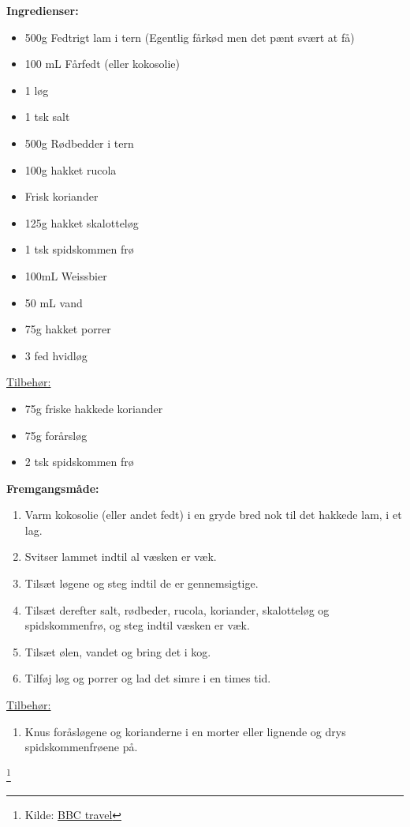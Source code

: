 \documentclass{book}
\begin{document}
{\begin{minipage}[t]{0.5\textwidth}
\textbf{Ingredienser:}
\begin{itemize}
    \item 500g Fedtrigt lam i tern (Egentlig fårkød men det pænt svært at få)
    \item 100 mL Fårfedt (eller kokosolie)
    \item 1 løg
    \item 1 tsk salt
    \item 500g Rødbedder i tern
    \item 100g hakket rucola
    \item Frisk koriander
    \item 125g hakket skalotteløg
    \item 1 tsk spidskommen frø
    \item 100mL Weissbier
    \item 50 mL vand
    \item 75g hakket porrer
    \item 3 fed hvidløg
\end{itemize}
\underline{Tilbehør:}
\begin{itemize}
    \item 75g friske hakkede koriander
    \item 75g forårsløg
    \item 2 tsk spidskommen frø
\end{itemize}
\end{minipage}%
\begin{minipage}[t]{0.5\textwidth}
\textbf{Fremgangsmåde:}
\begin{enumerate}
    \item Varm kokosolie (eller andet fedt) i en gryde bred nok til det hakkede lam, i et lag.
    \item Svitser lammet indtil al væsken er væk.
    \item Tilsæt løgene og steg indtil de er gennemsigtige.
    \item Tilsæt derefter salt, rødbeder, rucola, koriander, skalotteløg og spidskommenfrø, og steg indtil væsken er væk.
    \item Tilsæt ølen, vandet og bring det i kog.
    \item Tilføj løg og porrer og lad det simre i en times tid.
\end{enumerate}
\underline{Tilbehør:}
\begin{enumerate}
    \item Knus foråsløgene og korianderne i en morter eller lignende og drys spidskommenfrøene på.
\end{enumerate}
\end{minipage}
\enlargethispage{\baselineskip}
\footnote{Kilde: \href{https://www.bbc.com/travel/article/20191103-the-worlds-oldest-known-recipes-decoded}{BBC travel}}
\newpage
{}


}
\end{document}
